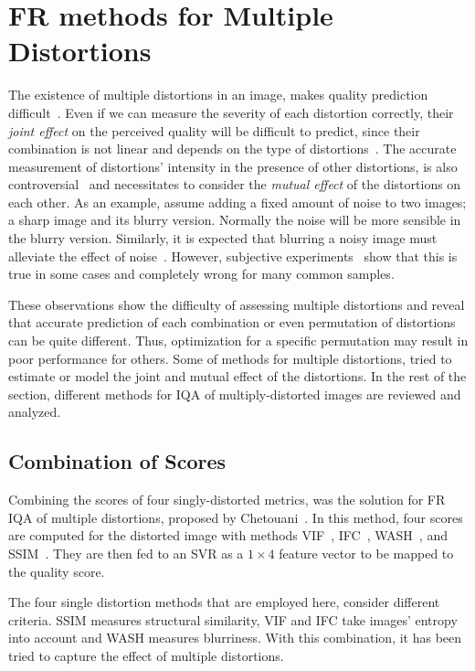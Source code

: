 \section{FR methods for Multiple Distortions}
The existence of multiple distortions in an image, makes quality prediction difficult~\cite{Chandler2013}. Even if we can measure the severity of each distortion correctly, their \emph{joint effect} on the perceived quality will be difficult to predict, since their combination is not linear and depends on the type of distortions~\cite{goodman1979multidimensional}. The accurate measurement of distortions' intensity in the presence of other distortions, is also controversial~\cite{linde1981similarity} and necessitates to consider the \emph{mutual effect} of the distortions on each other. As an example, assume adding a fixed amount of noise to two images; a sharp image and its blurry version. Normally the noise will be more sensible in the blurry version. Similarly, it is expected that blurring a noisy image must alleviate the effect of noise~\cite{linde1981similarity}. However, subjective experiments~\cite{Kayargadde1996} show that this is true in some cases and completely wrong for many common samples.

These observations show the difficulty of assessing multiple distortions and reveal that accurate prediction of each combination or even permutation of distortions can be quite different. Thus, optimization for a specific permutation may result in poor performance for others. Some of methods for multiple distortions, tried to estimate or model the joint and mutual effect of the distortions. In the rest of the section, different methods for IQA of multiply-distorted images are reviewed and analyzed.
\subsection{Combination of Scores}
Combining the scores of four singly-distorted metrics, was the solution for FR IQA of multiple distortions, proposed by Chetouani~\cite{Chetouani2016}. In this method, four scores are computed for the distorted image with methods VIF~\cite{Sheikh2006}, IFC~\cite{Sheikh2005}, WASH~\cite{Reenu2013}, and SSIM~\cite{Wang2004}. They are then fed to an SVR as a $1\times 4$ feature vector to be mapped to the quality score.

The four single distortion methods that are employed here, consider different criteria. SSIM measures structural similarity, VIF and IFC take images' entropy into account and WASH measures blurriness. With this combination, it has been tried to capture the effect of multiple distortions.

